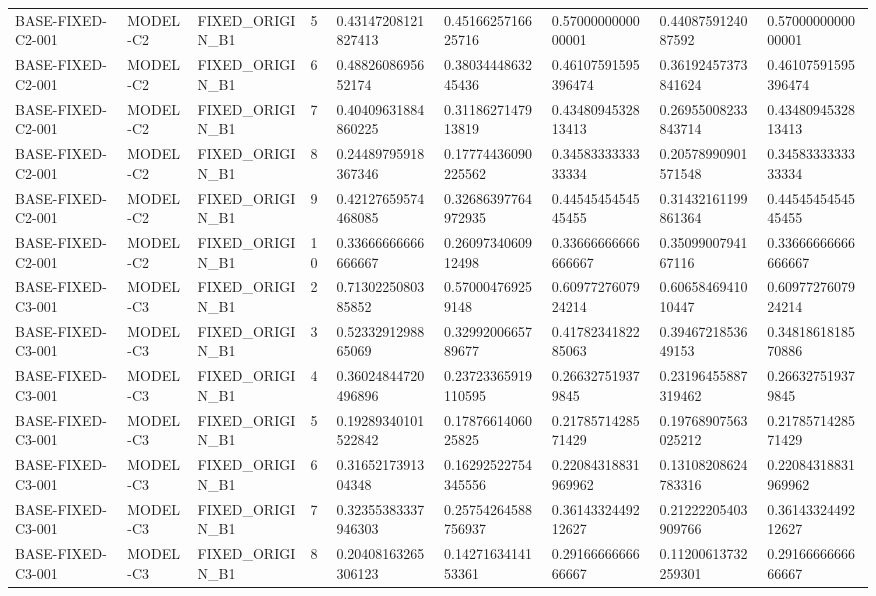 \begin{tabular}{lllllllll}
BASE-FIXED-C2-001 & MODEL-C2 & FIXED\_ORIGIN\_B1 & 5 & 0.43147208121827413 & 0.4516625716625716 & 0.5700000000000001 & 0.4408759124087592 & 0.5700000000000001 \\
BASE-FIXED-C2-001 & MODEL-C2 & FIXED\_ORIGIN\_B1 & 6 & 0.4882608695652174 & 0.3803444863245436 & 0.46107591595396474 & 0.36192457373841624 & 0.46107591595396474 \\
BASE-FIXED-C2-001 & MODEL-C2 & FIXED\_ORIGIN\_B1 & 7 & 0.40409631884860225 & 0.3118627147913819 & 0.4348094532813413 & 0.26955008233843714 & 0.4348094532813413 \\
BASE-FIXED-C2-001 & MODEL-C2 & FIXED\_ORIGIN\_B1 & 8 & 0.24489795918367346 & 0.17774436090225562 & 0.3458333333333334 & 0.20578990901571548 & 0.3458333333333334 \\
BASE-FIXED-C2-001 & MODEL-C2 & FIXED\_ORIGIN\_B1 & 9 & 0.42127659574468085 & 0.32686397764972935 & 0.4454545454545455 & 0.31432161199861364 & 0.4454545454545455 \\
BASE-FIXED-C2-001 & MODEL-C2 & FIXED\_ORIGIN\_B1 & 10 & 0.33666666666666667 & 0.2609734060912498 & 0.33666666666666667 & 0.3509900794167116 & 0.33666666666666667 \\
BASE-FIXED-C3-001 & MODEL-C3 & FIXED\_ORIGIN\_B1 & 2 & 0.7130225080385852 & 0.570004769259148 & 0.6097727607924214 & 0.6065846941010447 & 0.6097727607924214 \\
BASE-FIXED-C3-001 & MODEL-C3 & FIXED\_ORIGIN\_B1 & 3 & 0.5233291298865069 & 0.3299200665789677 & 0.4178234182285063 & 0.3946721853649153 & 0.3481861818570886 \\
BASE-FIXED-C3-001 & MODEL-C3 & FIXED\_ORIGIN\_B1 & 4 & 0.36024844720496896 & 0.23723365919110595 & 0.266327519379845 & 0.23196455887319462 & 0.266327519379845 \\
BASE-FIXED-C3-001 & MODEL-C3 & FIXED\_ORIGIN\_B1 & 5 & 0.19289340101522842 & 0.1787661406025825 & 0.2178571428571429 & 0.19768907563025212 & 0.2178571428571429 \\
BASE-FIXED-C3-001 & MODEL-C3 & FIXED\_ORIGIN\_B1 & 6 & 0.3165217391304348 & 0.16292522754345556 & 0.22084318831969962 & 0.13108208624783316 & 0.22084318831969962 \\
BASE-FIXED-C3-001 & MODEL-C3 & FIXED\_ORIGIN\_B1 & 7 & 0.32355383337946303 & 0.25754264588756937 & 0.3614332449212627 & 0.21222205403909766 & 0.3614332449212627 \\
BASE-FIXED-C3-001 & MODEL-C3 & FIXED\_ORIGIN\_B1 & 8 & 0.20408163265306123 & 0.1427163414153361 & 0.2916666666666667 & 0.11200613732259301 & 0.2916666666666667 \\

\end{tabular}
